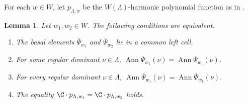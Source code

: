 \documentclass[12pt]{amsart}
\DeclareMathOperator{\Ann}{Ann}
\numberwithin{equation}{section}
\newtheorem{lem}[thm]{Lemma}
\theoremstyle{remark}
\def\AND{\quad \text{and} \quad}
\def\bPsi{\overline{\Psi}}
\begin{document}
For each $w\in W$, let $p_{\Lambda,w}$  be the $W(\Lambda)$-harmonic polynomial function as in .

\begin{lem}\label{leftp}
Let  $w_1, w_2\in  W$.
The following conditions are equivalent.
\begin{enumerate}[label=(\roman*),wide=0pt]
\item The basal elements $\overline \Psi_{w_1}$ and $\overline \Psi_{w_2}$ lie in a common left cell.
\item For some regular dominant $\nu\in \Lambda$, $\Ann \bPsi_{w_1}(\nu)  = \Ann \bPsi_{w_1}(\nu)$.
\item For every regular dominant $\nu\in \Lambda$, $\Ann \bPsi_{w_1}(\nu)  = \Ann \bPsi_{w_1}(\nu)$.
\item The equality $\C\cdot p_{\Lambda, w_1}=\C\cdot p_{\Lambda, w_2}$ holds.
\end{enumerate}
%

\end{lem}
\end{document}
